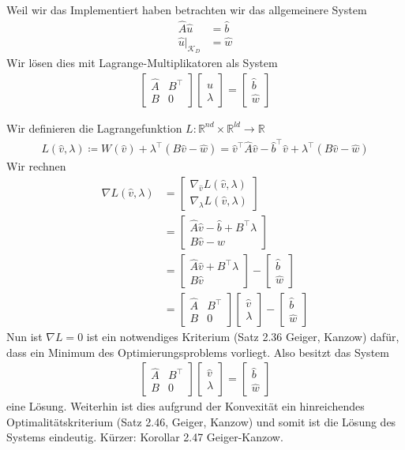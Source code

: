\documentclass{scrartcl}
\def\R{\mathbb{R}}
\newcommand{\cK}{\mathcal{K}}
\newcommand{\hu}{\hat{u}}
\newcommand{\hv}{\hat{v}}
\newcommand{\hA}{\hat{A}}
\newcommand{\hw}{\hat{w}}
\newcommand{\hb}{\hat{b}}
\newcommand{\vect}[1]{\begin{bmatrix} #1 \end{bmatrix}}
\begin{document}
Weil wir das Implementiert haben betrachten wir das allgemeinere System
\begin{align*}
	\hA\hu &= \hb \\
	\hu\big\vert_{\cK_D} &= \hw
\end{align*}
Wir lösen dies mit Lagrange-Multiplikatoren als System
\begin{align*}
	\begin{bmatrix}
		\hA & B^\top \\
		B & 0
	\end{bmatrix}
	\vect{\hu \\ \lambda}
	= \vect{\hb \\ \hw}
\end{align*}

 Wir definieren die Lagrangefunktion $L\colon\R^{nd}\times\R^{ld}\to\R$
\begin{align*}
	L(\hv,\lambda)\coloneqq W(\hv)+\lambda^\top(B\hv-\hw)
	= \hv^\top\hA\hv-\hb^\top\hv+\lambda^\top(B\hv-\hw)
\end{align*}
Wir rechnen
\begin{align*}
	\nabla L(\hv,\lambda)
	&= \begin{bmatrix}
		\nabla_{\hv}L(\hv,\lambda) \\
		\nabla_{\lambda}L(\hv,\lambda)
	\end{bmatrix} \\
	&= \begin{bmatrix}
		\hA\hv-\hb+B^\top\lambda \\
		B\hv-\hw
	\end{bmatrix} \\
	&= \begin{bmatrix}
		\hA\hv+B^\top\lambda \\
		B\hv
	\end{bmatrix}
	-\vect{\hb \\ \hw} \\
	&= \begin{bmatrix}
		\hA & B^\top \\
		B & 0
	\end{bmatrix}
	\vect{\hv \\ \lambda}
	-\vect{\hb \\ \hw}
\end{align*}
Nun ist $\nabla L=0$ ist ein notwendiges Kriterium (Satz 2.36 Geiger, Kanzow) dafür, dass ein Minimum des Optimierungsproblems vorliegt. Also besitzt das System
\begin{align*}
	\begin{bmatrix}
		\hA & B^\top \\
		B & 0
	\end{bmatrix}
	\vect{\hv \\ \lambda}
	=\vect{\hb \\ \hw}
\end{align*}
eine Lösung. Weiterhin ist dies aufgrund der Konvexität ein hinreichendes Optimalitätskriterium (Satz 2.46, Geiger, Kanzow) und somit ist die Lösung des Systems eindeutig. Kürzer: Korollar 2.47 Geiger-Kanzow.
\end{document}
